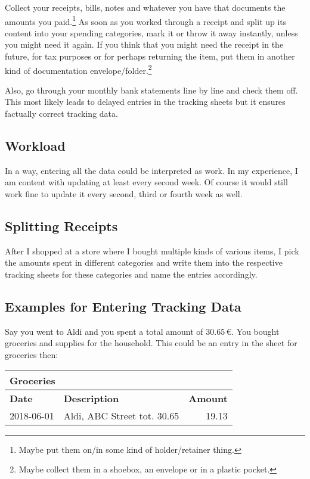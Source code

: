 Collect your receipts, bills, notes and whatever you have that documents the amounts you paid.\footnote{Maybe put them on/in some kind of holder/retainer thing.}
As soon as you worked through a receipt and split up its content into your spending categories, mark it or throw it away instantly, unless you might need it again.
If you think that you might need the receipt in the future, \eg for tax purposes or for perhaps returning the item, put them in another kind of documentation envelope/folder.\footnote{Maybe collect them in a shoebox, an envelope or in a plastic pocket.}

Also, go through your monthly bank statements line by line and check them off.
This most likely leads to delayed entries in the tracking sheets but it ensures factually correct tracking data.

\subsection{Workload}
\label{subsec:tracking-workload}

In a way, entering all the data could be interpreted as work.
In my experience, I am content with updating \tfn at least every second week.
Of course it would still work fine to update it every second, third or fourth week as well.


\subsection{Splitting Receipts}
\label{subsec:splitting-receipts}

After I shopped at a store where I bought multiple kinds of various items, I pick the amounts spent in different categories and write them into the respective tracking sheets for these categories and name the entries accordingly.

\subsection{Examples for Entering Tracking Data}
\label{subsec:examples-for-entering-tracking-data}

Say you went to Aldi and you spent a total amount of 30.65\,€.
You bought groceries and supplies for the household.
This could be an entry in the sheet for groceries then:
\begin{center}\sffamily
	\begin{tabular}{|l|l|r|}
		\multicolumn{3}{l}{Groceries}\\
		\hline
		\textbf{Date} & \textbf{Description} & \textbf{Amount}\rmfamily\\
		\hline
		2018-06-01 & Aldi, ABC Street tot. 30.65 & 19.13\\
		\hline
	\end{tabular}
\end{center}

